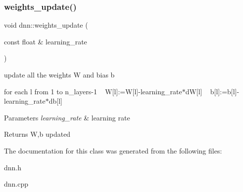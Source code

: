 \subsubsection{\texorpdfstring{weights\+\_\+update()}{weights\_update()}}
{\footnotesize\ttfamily void dnn\+::weights\+\_\+update (\begin{DoxyParamCaption}\item[{const float \&}]{learning\+\_\+rate }\end{DoxyParamCaption})}

update all the weights W and bias b ~\newline


for each l from 1 to n\+\_\+layers-\/1 ~\newline
 W\mbox{[}l\mbox{]}\+:=W\mbox{[}l\mbox{]}-\/learning\+\_\+rate$\ast$dW\mbox{[}l\mbox{]} ~\newline
 b\mbox{[}l\mbox{]}\+:=b\mbox{[}l\mbox{]}-\/learning\+\_\+rate$\ast$db\mbox{[}l\mbox{]} ~\newline



\begin{DoxyParams}{Parameters}
{\em learning\+\_\+rate} & learning rate \\
\hline
\end{DoxyParams}
\begin{DoxyReturn}{Returns}
W,b updated 
\end{DoxyReturn}


The documentation for this class was generated from the following files\+:\begin{DoxyCompactItemize}
\item 
dnn.\+h\item 
dnn.\+cpp\end{DoxyCompactItemize}
